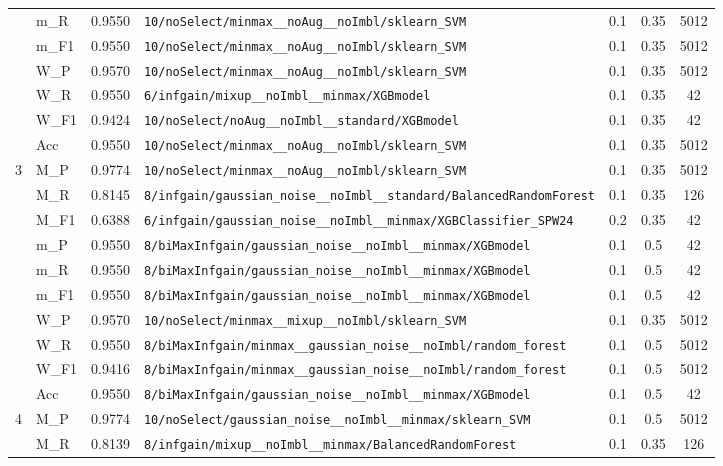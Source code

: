 \begin{table}[htbp]
\begin{tabular}{|c|l|c|>{\ttfamily\footnotesize}p{7.2cm}|c|c|c|}
 & m\_R & 0.9550 & \texttt{10/noSelect/minmax\_\_noAug\_\_noImbl/sklearn\_SVM} & 0.1 & 0.35  & 5012 \\ 
 & m\_F1 & 0.9550 & \texttt{10/noSelect/minmax\_\_noAug\_\_noImbl/sklearn\_SVM} & 0.1 & 0.35  & 5012 \\ 
 & W\_P & 0.9570 & \texttt{10/noSelect/minmax\_\_noAug\_\_noImbl/sklearn\_SVM} & 0.1 & 0.35  & 5012 \\ 
 & W\_R & 0.9550 & \texttt{6/infgain/mixup\_\_noImbl\_\_minmax/XGBmodel} & 0.1 & 0.35  & 42 \\ 
 & W\_F1 & 0.9424 & \texttt{10/noSelect/noAug\_\_noImbl\_\_standard/XGBmodel} & 0.1 & 0.35  & 42 \\ 
 & Acc & 0.9550 & \texttt{10/noSelect/minmax\_\_noAug\_\_noImbl/sklearn\_SVM} & 0.1 & 0.35  & 5012 \\ 
\hline
\multirow{10}{*}{3} & M\_P & 0.9774 & \texttt{10/noSelect/minmax\_\_noAug\_\_noImbl/sklearn\_SVM} & 0.1 & 0.35  & 5012 \\ 
 & M\_R & 0.8145 & \texttt{8/infgain/gaussian\_noise\_\_noImbl\_\_standard/BalancedRandomForest} & 0.1 & 0.35  & 126 \\ 
 & M\_F1 & 0.6388 & \texttt{6/infgain/gaussian\_noise\_\_noImbl\_\_minmax/XGBClassifier\_SPW24} & 0.2 & 0.35  & 42 \\ 
 & m\_P & 0.9550 & \texttt{8/biMaxInfgain/gaussian\_noise\_\_noImbl\_\_minmax/XGBmodel} & 0.1 & 0.5  & 42 \\ 
 & m\_R & 0.9550 & \texttt{8/biMaxInfgain/gaussian\_noise\_\_noImbl\_\_minmax/XGBmodel} & 0.1 & 0.5  & 42 \\ 
 & m\_F1 & 0.9550 & \texttt{8/biMaxInfgain/gaussian\_noise\_\_noImbl\_\_minmax/XGBmodel} & 0.1 & 0.5  & 42 \\ 
 & W\_P & 0.9570 & \texttt{10/noSelect/minmax\_\_mixup\_\_noImbl/sklearn\_SVM} & 0.1 & 0.35  & 5012 \\ 
 & W\_R & 0.9550 & \texttt{8/biMaxInfgain/minmax\_\_gaussian\_noise\_\_noImbl/random\_forest} & 0.1 & 0.5  & 5012 \\ 
 & W\_F1 & 0.9416 & \texttt{8/biMaxInfgain/minmax\_\_gaussian\_noise\_\_noImbl/random\_forest} & 0.1 & 0.5  & 5012 \\ 
 & Acc & 0.9550 & \texttt{8/biMaxInfgain/gaussian\_noise\_\_noImbl\_\_minmax/XGBmodel} & 0.1 & 0.5  & 42 \\ 
\hline
\multirow{10}{*}{4} & M\_P & 0.9774 & \texttt{10/noSelect/gaussian\_noise\_\_noImbl\_\_minmax/sklearn\_SVM} & 0.1 & 0.5  & 5012 \\ 
 & M\_R & 0.8139 & \texttt{8/infgain/mixup\_\_noImbl\_\_minmax/BalancedRandomForest} & 0.1 & 0.35  & 126 \\ 

\end{tabular}
\end{table}
